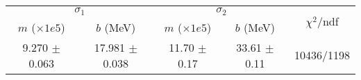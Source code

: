 \begin{tabular}{cc|cc||c}
\multicolumn{2}{c|}{$\sigma_1$} & \multicolumn{2}{|c}{$\sigma_2$} & \multirow{2}{*}{$\chi^2/$ndf} \\
$m$ ($\times1e5$) & $b$ (MeV) & $m$ ($\times1e5$) & $b$ (MeV) & \\
\hline
9.270 $\pm$ 0.063 & 17.981 $\pm$ 0.038 & 11.70 $\pm$ 0.17 & 33.61 $\pm$ 0.11 & 10436/1198\\
\end{tabular}
